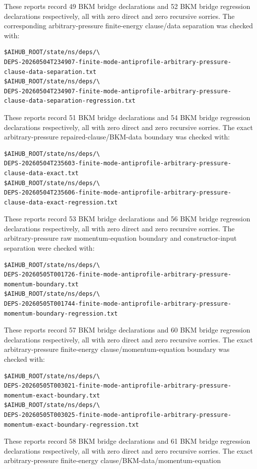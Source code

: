 \documentclass[11pt]{article}
\begin{document}
These reports record 49 BKM bridge declarations and 52 BKM bridge regression
declarations respectively, all with zero direct and zero recursive sorries.
The corresponding arbitrary-pressure finite-energy clause/data separation was
checked with:
\begin{verbatim}
$AIHUB_ROOT/state/ns/deps/\
DEPS-20260504T234907-finite-mode-antiprofile-arbitrary-pressure-clause-data-separation.txt
$AIHUB_ROOT/state/ns/deps/\
DEPS-20260504T234907-finite-mode-antiprofile-arbitrary-pressure-clause-data-separation-regression.txt
\end{verbatim}
These reports record 51 BKM bridge declarations and 54 BKM bridge regression
declarations respectively, all with zero direct and zero recursive sorries.
The exact arbitrary-pressure repaired-clause/BKM-data boundary was checked
with:
\begin{verbatim}
$AIHUB_ROOT/state/ns/deps/\
DEPS-20260504T235603-finite-mode-antiprofile-arbitrary-pressure-clause-data-exact.txt
$AIHUB_ROOT/state/ns/deps/\
DEPS-20260504T235606-finite-mode-antiprofile-arbitrary-pressure-clause-data-exact-regression.txt
\end{verbatim}
These reports record 53 BKM bridge declarations and 56 BKM bridge regression
declarations respectively, all with zero direct and zero recursive sorries.
The arbitrary-pressure raw momentum-equation boundary and constructor-input
separation were checked with:
\begin{verbatim}
$AIHUB_ROOT/state/ns/deps/\
DEPS-20260505T001726-finite-mode-antiprofile-arbitrary-pressure-momentum-boundary.txt
$AIHUB_ROOT/state/ns/deps/\
DEPS-20260505T001744-finite-mode-antiprofile-arbitrary-pressure-momentum-boundary-regression.txt
\end{verbatim}
These reports record 57 BKM bridge declarations and 60 BKM bridge regression
declarations respectively, all with zero direct and zero recursive sorries.
The exact arbitrary-pressure finite-energy clause/momentum-equation boundary
was checked with:
\begin{verbatim}
$AIHUB_ROOT/state/ns/deps/\
DEPS-20260505T003021-finite-mode-antiprofile-arbitrary-pressure-momentum-exact-boundary.txt
$AIHUB_ROOT/state/ns/deps/\
DEPS-20260505T003025-finite-mode-antiprofile-arbitrary-pressure-momentum-exact-boundary-regression.txt
\end{verbatim}
These reports record 58 BKM bridge declarations and 61 BKM bridge regression
declarations respectively, all with zero direct and zero recursive sorries.
The exact arbitrary-pressure finite-energy clause/BKM-data/momentum-equation
\end{document}
